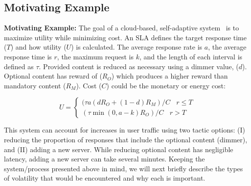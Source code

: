 

% 


\subsection{Motivating Example}
\label{sec: motivatingexample}


\noindent\textbf{Motivating Example:} The goal of a cloud-based, self-adaptive system~\cite{moreno2017adaptation} is to maximize utility while minimizing cost. An SLA defines the target response time ($T$) and how utility ($U$) is calculated. %
The average response rate is $a$, the average response time is $r$, the maximum request is $k$, and the length of each interval is defined as $\tau$. Provided content is reduced as necessary using a dimmer value, ($d$). Optional content has reward of ($R_O$) which produces a higher reward than mandatory content ($R_M$). Cost ($C$) could be the monetary or energy cost:

\begin{equation} \label{eq: motivatingExample}
	U = \left\{ \begin{array}{rl}
 	(\tau a (dR_O+(1-d)R_M)/C~~~~r\leq T \\ 
  	(\tau \min (0,a-k)R_O)/C~~~~r> T 
       \end{array} \right.
\end{equation}

This system can account for increases in user traffic using two tactic options: (I) reducing the proportion of responses that include the optional content (dimmer), and (II) adding a new server. While reducing optional content has negligible latency, adding a new server can take several minutes. Keeping the system/process presented above in mind, we will next briefly describe the types of volatility that would be encountered and why each is important. %

